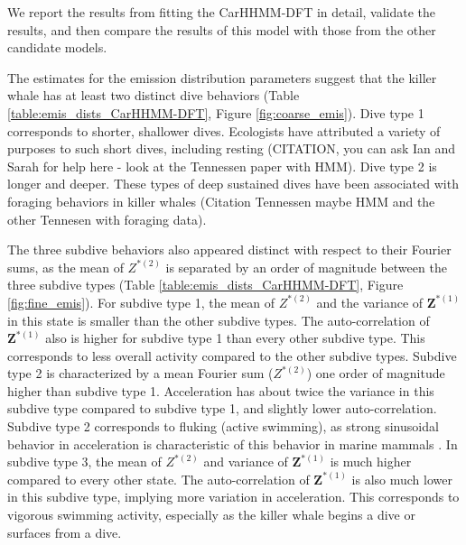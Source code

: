 



We report the results from fitting the CarHHMM-DFT in detail, validate the results, and then compare the results of this model with those from the other candidate models.

The estimates for the emission distribution parameters suggest that the killer whale has at least two distinct dive behaviors (Table \ref{table:emis_dists_CarHHMM-DFT}, Figure \ref{fig:coarse_emis}). 
Dive type 1 corresponds to shorter, shallower dives. Ecologists have attributed a variety of purposes to such short dives, including resting (CITATION, you can ask Ian and Sarah for help here - look at the Tennessen paper with HMM).
Dive type 2 is longer and deeper. These types of deep sustained dives have been associated with foraging behaviors in killer whales (Citation Tennessen maybe HMM and the other Tennesen with foraging data).

The three subdive behaviors also appeared distinct with respect to their Fourier sums, as the mean of $Z^{*(2)}$ is separated by an order of magnitude between the three subdive types (Table \ref{table:emis_dists_CarHHMM-DFT}, Figure \ref{fig:fine_emis}). 
For subdive type 1, the mean of $Z^{*(2)}$ and the variance of $\mathbf{Z}^{*(1)}$ in this state is smaller than the other subdive types. The auto-correlation of $\mathbf{Z}^{*(1)}$ also is higher for subdive type 1 than every other subdive type. This corresponds to less overall activity compared to the other subdive types. 
Subdive type 2 is characterized by a mean Fourier sum ($Z^{*(2)}$) one order of magnitude higher than subdive type 1. Acceleration has about twice the variance in this subdive type compared to subdive type 1, and slightly lower auto-correlation. Subdive type 2 corresponds to fluking (active swimming), as strong sinusoidal behavior in acceleration is characteristic of this behavior in marine mammals \citep{Simon:2012}.
In subdive type 3, the mean of $Z^{*(2)}$ and variance of $\mathbf{Z}^{*(1)}$ is much higher compared to every other state. The auto-correlation of $\mathbf{Z}^{*(1)}$ is also much lower in this subdive type, implying more variation in acceleration. This corresponds to vigorous swimming activity, especially as the killer whale begins a dive or surfaces from a dive. 

